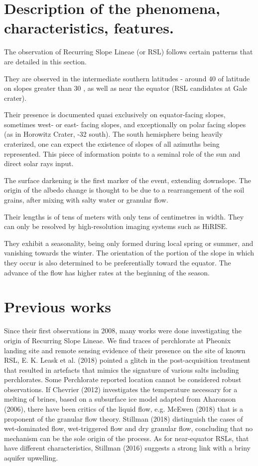 \documentclass{report}
\begin{document}
\section{Description of the phenomena, characteristics, features.}
The observation of Recurring Slope Lineae (or RSL) follows certain patterns that are detailed in this section.

They are observed in the intermediate southern latitudes - around 40 \degree of latitude on slopes greater than 30 \degree, as well as near the equator (RSL candidates at Gale crater). 

Their presence is documented quasi exclusively on equator-facing slopes, sometimes west- or east- facing slopes, and exceptionally on polar facing slopes (as in Horowitz Crater, -32 \degree south). The south hemisphere being heavily craterized, one can expect the existence of slopes of all azimuths being represented. This piece of information points to a seminal role of the sun and direct solar rays input. 

The surface darkening is the first marker of the event, extending downslope. The origin of the albedo change is thought to be due to a rearrangement of the soil grains, after mixing with salty water or granular flow.  

Their lengths is of tens of meters with only tens of centimetres in width. They can only be resolved by high-resolution imaging systems such as HiRISE. 

They exhibit a seasonality, being only formed during local spring or summer, and vanishing towards the winter.
The orientation of the portion of the slope in which they occur is also determined to be preferentially toward the equator. 
The advance of the flow has higher rates at the beginning of the season.

\section{Previous works}

Since their first observations in 2008, many works were done investigating the origin of Recurring Slope Lineae.
We find traces of perchlorate at Pheonix landing site and remote sensing evidence of their presence on the site of known RSL, E. K. Leask et al. (2018) pointed a glitch in the post-acquisition treatment that resulted in artefacts that mimics the signature of various salts including perchlorates. Some Perchlorate reported location cannot be considered robust observations.  
If Chevrier (2012) investigates the temperature necessary for a melting of brines, based on a subsurface ice model adapted from Aharonson (2006), there have been critics of the liquid flow, e.g. McEwen (2018) that is a proponent of the granular flow theory. Stillman (2018) distinguish the cases of wet-dominated flow, wet-triggered flow and dry granular flow, concluding that no mechanism can be the sole origin of the process. 
As for near-equator RSLs, that have different characteristics, Stillman (2016) suggests a strong link with a briny aquifer upwelling.  
\end{document}
